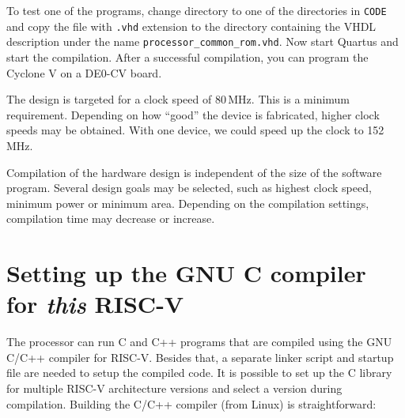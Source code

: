 \documentclass[12pt]{article}
\begin{document}
To test one of the programs, change directory to one of the directories in \texttt{CODE} and copy the file with \texttt{.vhd} extension to the directory containing the VHDL description under the name \texttt{processor\_common\_rom.vhd}.
Now start Quartus and start the compilation. After a successful compilation, you can program the Cyclone V on a DE0-CV board.

The design is targeted for a clock speed of 80\,MHz. This is a minimum requirement. Depending on how ``good'' the device is fabricated, higher clock speeds may be obtained. With one device, we could speed up the clock to 152\,MHz.

Compilation of the hardware design is independent of the size of the software program. Several design goals may be selected, such as highest clock speed, minimum power or minimum area. Depending on the compilation settings, compilation time may decrease or increase.


\section{Setting up the GNU C compiler for \textit{this} RISC-V}
\label{sec:ccompiler}
The processor can run C and C++ programs that are compiled using the GNU C/C++ compiler for RISC-V. Besides that, a separate linker script and startup file are needed to setup the compiled code. It is possible to set up the C library for multiple RISC-V architecture versions and select a version during compilation. Building the C/C++ compiler (from Linux) is straightforward:
\end{document}
